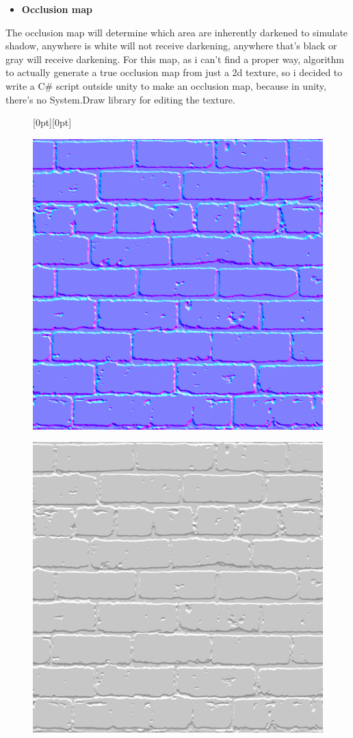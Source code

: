 \documentclass[a4paper, 13pt]{extarticle}
\begin{document}
{\begin{itemize}
	\item \bfseries Occlusion map	 	
\end{itemize}
The occlusion map will determine which area are inherently darkened to simulate shadow, anywhere is white will not receive darkening, anywhere that's black or gray will receive darkening. For this map, as i can't find a proper way, algorithm to actually generate a true occlusion map from just a 2d texture, so i decided to write a C\# script outside unity to make an occlusion map, because in unity, there's no System.Draw library for editing the texture.
\newpage
\begin{figure}[h]
	\centering
	\raisebox{-25mm}[0pt][0pt]{
		\begin{minipage}{.4\textwidth}
			\centering
			\includegraphics[width=0.8\linewidth]{intructions/Brick001_n.png}
			\centering
			\label{fig:test22}
		\end{minipage}
		\begin{minipage}{.4\textwidth}
			\centering
			\includegraphics[width=0.8\linewidth]{intructions/Brick001_occ.png}

\end{minipage}}
\end{figure}}
\end{document}
